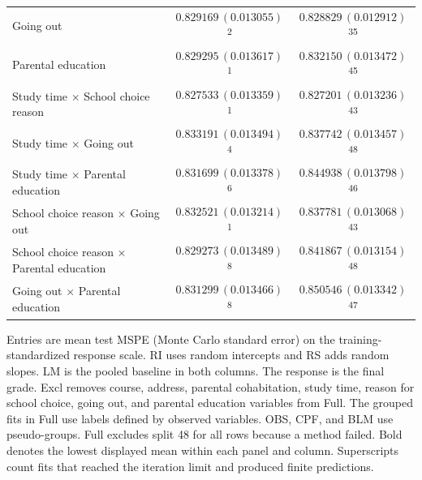 \begin{table}[!htbp]
\begin{tabular}{@{}lcc@{}}
    Going out & $0.829169\,(0.013055)$\textsuperscript{2} & $0.828829\,(0.012912)$\textsuperscript{35} \\
    Parental education & $0.829295\,(0.013617)$\textsuperscript{1} & $0.832150\,(0.013472)$\textsuperscript{45} \\
    Study time $\times$ School choice reason & $0.827533\,(0.013359)$\textsuperscript{1} & $0.827201\,(0.013236)$\textsuperscript{43} \\
    Study time $\times$ Going out & $0.833191\,(0.013494)$\textsuperscript{4} & $0.837742\,(0.013457)$\textsuperscript{48} \\
    Study time $\times$ Parental education & $0.831699\,(0.013378)$\textsuperscript{6} & $0.844938\,(0.013798)$\textsuperscript{46} \\
    School choice reason $\times$ Going out & $0.832521\,(0.013214)$\textsuperscript{1} & $0.837781\,(0.013068)$\textsuperscript{43} \\
    School choice reason $\times$ Parental education & $0.829273\,(0.013489)$\textsuperscript{8} & $0.841867\,(0.013154)$\textsuperscript{48} \\
    Going out $\times$ Parental education & $0.831299\,(0.013466)$\textsuperscript{8} & $0.850546\,(0.013342)$\textsuperscript{47} \\
    \bottomrule
  \end{tabular}
  \par\smallskip
  \begin{minipage}{\linewidth}
    \footnotesize\raggedright
    Entries are mean test MSPE (Monte Carlo standard error) on the training-standardized response scale. RI uses random intercepts and RS adds random slopes. LM is the pooled baseline in both columns. The response is the final grade. Excl removes course, address, parental cohabitation, study time, reason for school choice, going out, and parental education variables from Full. The grouped fits in Full use labels defined by observed variables. OBS, CPF, and BLM use pseudo-groups. Full excludes split 48 for all rows because a method failed. Bold denotes the lowest displayed mean within each panel and column. Superscripts count fits that reached the iteration limit and produced finite predictions.
  \end{minipage}
\end{table}

